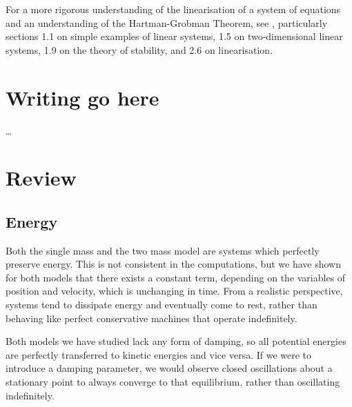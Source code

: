 \documentclass{report}
\begin{document}
For a more rigorous understanding of the linearisation of a system of equations and an understanding of the Hartman-Grobman Theorem,
see \cite{perko_textbook_1996},
particularly sections 1.1 on simple examples of linear systems,
1.5 on two-dimensional linear systems,
1.9 on the theory of stability,
and 2.6 on linearisation.

\chapter{Writing go here}

\dots

\chapter{Review}

\section{Energy}

Both the single mass and the two mass model are systems which perfectly preserve energy.
This is not consistent in the computations,
but we have shown for both models that there exists a constant term,
depending on the variables of position and velocity,
which is unchanging in time.
From a realistic perspective,
systems tend to dissipate energy and eventually come to rest,
rather than behaving like perfect conservative machines that operate indefinitely.

Both models we have studied lack any form of damping,
so all potential energies are perfectly transferred to kinetic energies and vice versa.
If we were to introduce a damping parameter,
we would observe closed oscillations about a stationary point to always converge to that equilibrium,
rather than oscillating indefinitely.
\end{document}
